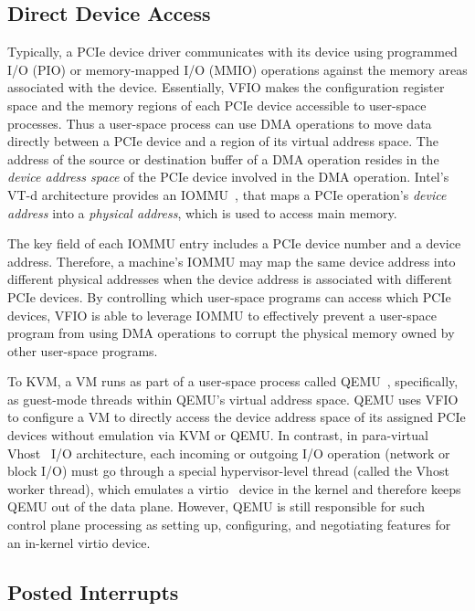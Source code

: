 \subsection{Direct Device Access}
\vspace{-0.05in}
Typically, a PCIe device driver communicates with its device using programmed I/O (PIO) or
memory-mapped I/O (MMIO) operations against the memory areas associated with the device.
Essentially, VFIO makes the configuration register space and the memory regions of
each PCIe device accessible to user-space processes.
Thus a user-space process can use DMA operations to move data directly between a PCIe device and
a region of its virtual address space.
The address of the source or destination buffer of a DMA operation resides in
the {\em device address space} of the PCIe device involved in the DMA operation.
Intel's VT-d architecture provides an IOMMU~\cite{ben:2006}, that maps a
PCIe operation's {\em device address} into a {\em physical address},
which is used to access main memory.

The key field of each IOMMU entry includes a PCIe device number and a device address.
Therefore, a machine's IOMMU may map the same device address into different physical addresses when the device address is associated with different PCIe devices.
By controlling which user-space programs can access which PCIe devices, VFIO is able to leverage IOMMU to effectively prevent a user-space program
from using DMA operations to corrupt the physical memory owned by other user-space programs.

To KVM, a VM runs as part of a user-space process  called QEMU~\cite{qemu},
specifically, as guest-mode threads within QEMU's virtual address space.
QEMU uses VFIO to configure a VM to directly access the device address space of
its assigned PCIe devices without emulation via KVM or QEMU.
In contrast, in para-virtual Vhost~\cite{vhost-net} I/O architecture,
each incoming or outgoing I/O operation (network or block I/O) must go through
a special hypervisor-level thread (called the Vhost worker thread),
which emulates a virtio~\cite{russell:2008} device in the kernel and
therefore keeps QEMU out of the data plane.
However, QEMU is still responsible for such control plane processing as setting up,
configuring, and negotiating features for an in-kernel virtio device.


\vspace{-0.1in}
\subsection{Posted Interrupts}
\vspace{-0.05in}

